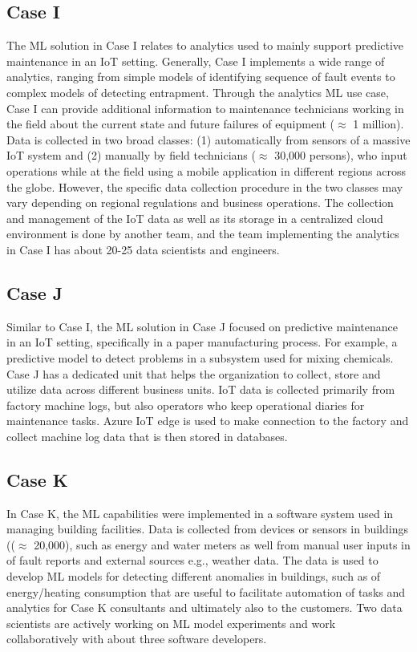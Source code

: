 \subsection{Case I}
The ML solution in Case I relates to analytics used to mainly support predictive maintenance in an IoT setting. Generally, Case I implements a wide range of analytics, ranging from simple models of identifying sequence of fault events to complex models of detecting entrapment. Through the analytics ML use case, Case I can provide additional information to maintenance technicians working in the field about the current state and future failures of equipment ($\approx$ 1 million). Data is collected in two broad classes: (1) automatically from sensors of a massive IoT system and (2) manually by field technicians ($\approx$ 30,000 persons), who input operations while at the field using a mobile application in different regions across the globe. However, the specific data collection procedure in the two classes may vary depending on regional regulations and business operations. The collection and management of the IoT data as well as its storage in a centralized cloud environment is done by another team, and the team implementing the analytics in Case I has about 20-25 data scientists and engineers. 

\subsection{Case J}
Similar to Case I, the ML solution in Case J focused on predictive maintenance in an IoT setting, specifically in a paper manufacturing process. For example, a predictive model to detect problems in a subsystem used for mixing chemicals. Case J has a dedicated unit that helps the organization to collect, store and utilize data across different business units. IoT data is collected primarily from factory machine logs, but also operators who keep operational diaries for maintenance tasks. Azure IoT edge is used to make connection to the factory and collect machine log data that is then stored in databases. 


\subsection{Case K}
In Case K, the ML capabilities were implemented in a software system used in managing building facilities. Data is collected from devices or sensors in buildings (($\approx$ 20,000), such as energy and water meters as well from manual user inputs in of fault reports and external sources e.g., weather data. The data is used to develop ML models for detecting different anomalies in buildings, such as of energy/heating consumption that are useful to facilitate automation of tasks and analytics for Case K consultants and ultimately also to the customers. Two data scientists are actively working on ML model experiments and work collaboratively with about three software developers.


